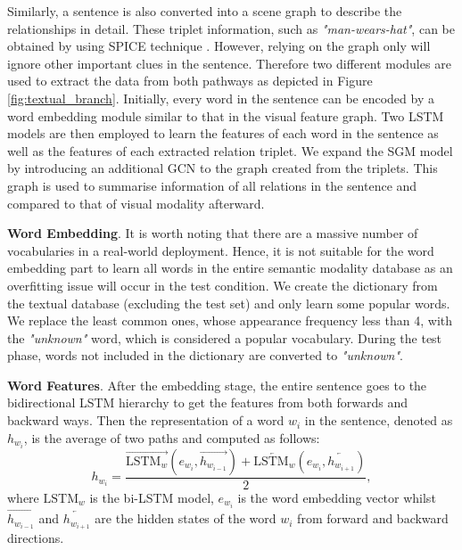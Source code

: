 \documentclass{IOS-Book-Article}
\begin{document}
Similarly, a sentence is also converted into a scene graph to describe the relationships in detail. These triplet information, such as \textit{"man-wears-hat"}, can be obtained by using SPICE technique \cite{anderson2016spice}. However, relying on the graph only will ignore other important clues in the sentence. Therefore two different modules are used to extract the data from both pathways as depicted in Figure \ref{fig:textual_branch}. Initially, every word in the sentence can be encoded by a word embedding module similar to that in the visual feature graph. Two LSTM models \cite{hochreiter1997long} are then employed to learn the features of each word in the sentence as well as the features of each extracted relation triplet. We expand the SGM model by introducing an additional GCN to the graph created from the triplets. This graph is used to summarise information of all relations in the sentence and compared to that of visual modality afterward.

\textbf{Word Embedding}. It is worth noting that there are a massive number of vocabularies in a real-world deployment. Hence, it is not suitable for the word embedding part to learn all words in the entire semantic modality database as an overfitting issue will occur in the test condition. We create the dictionary from the textual database (excluding the test set) and only learn some popular words. We replace the least common ones, whose appearance frequency less than 4, with the \textit{"unknown"} word, which is considered a popular vocabulary. During the test phase, words not included in the dictionary are converted to \textit{"unknown"}.

\textbf{Word Features}. After the embedding stage, the entire sentence goes to the bidirectional LSTM hierarchy to get the features from both forwards and backward ways. Then the representation of a word $w_i$ in the sentence, denoted as $h_{w_i}$, is the average of two paths and computed as follows:
\begin{equation}
    h_{w_i} = \frac{\overrightarrow{\text{LSTM}_w}(e_{w_i}, \overrightarrow{h_{w_{i-1}}})
    + \overleftarrow{\text{LSTM}_w}(e_{w_i}, \overleftarrow{h_{w_{i+1}}})}{2},
\end{equation}
where $\text{LSTM}_w$ is the bi-LSTM model, $e_{w_i}$ is the word embedding vector whilst $\overrightarrow{h_{w_{i-1}}}$ and $\overleftarrow{h_{w_{i+1}}}$ are the hidden states of the word $w_i$ from forward and backward directions.
\end{document}
